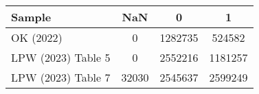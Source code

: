 \begin{tabular}{lccc}
  \hline
Sample & NaN & 0 & 1 \\ 
  \hline
OK (2022) &   0 & 1282735 & 524582 \\ 
  LPW (2023) Table 5 &   0 & 2552216 & 1181257 \\ 
  LPW (2023) Table 7 & 32030 & 2545637 & 2599249 \\ 
   \hline
\end{tabular}

